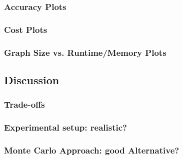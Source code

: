 \subsubsection{Accuracy Plots}
\subsubsection{Cost Plots}
\subsubsection{Graph Size vs. Runtime/Memory Plots}

\subsection{Discussion}
\subsubsection{Trade-offs}
\subsubsection{Experimental setup: realistic?}
\subsubsection{Monte Carlo Approach: good Alternative?}
